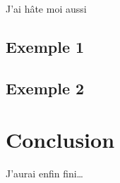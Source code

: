 \documentclass[11pt,a4paper,krantz2,11pt,oneside]{krantz}
\begin{document}
J'ai hâte moi aussi

\hypertarget{exemple-1}{%
\section{Exemple 1}\label{exemple-1}}

\hypertarget{exemple-2}{%
\section{Exemple 2}\label{exemple-2}}

\hypertarget{conclusion}{%
\chapter*{Conclusion}\label{conclusion}}


J'aurai enfin fini\ldots{}



\printindex
\end{document}
